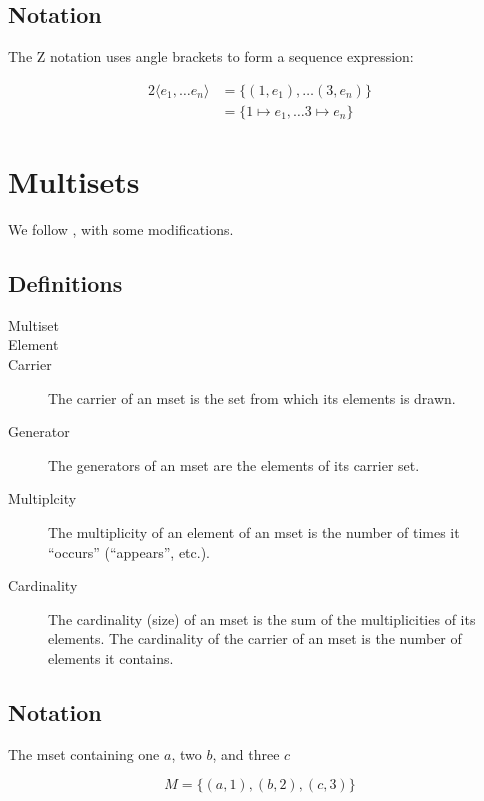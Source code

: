 \documentclass[reqno,12pt]{tufte-book}
\numberwithin{equation}{subsection}
\begin{document}
\subsection{Notation}

The Z notation uses angle brackets to form a sequence expression:

\begin{alignat}{2}
  \langle e_1,\ldots e_n\rangle &= \{(1,e_1),\ldots (3,e_n)\} \\
  &= \{1\mapsto e_1,\ldots 3\mapsto e_n\}
\end{alignat}

\section{Multisets}

We follow \citet{singh_overview_2007}, with some modifications.

\subsection{Definitions}

\begin{description}
\item [Multiset]
\item [Element]
\item [Carrier]  The carrier of an mset is the set from which its elements is drawn.
\item [Generator]  The generators of an mset are the elements of its carrier set.
\item [Multiplcity]  The multiplicity of an element of an mset is the number of times it ``occurs'' (``appears'', etc.).
\item [Cardinality] The cardinality (size) of an mset is the sum of
  the multiplicities of its elements.  The cardinality of the carrier of an mset is the number of elements it contains.
\end{description}

\subsection{Notation}

The mset containing one $a$, two $b$, and three $c$

\begin{equation}
  M = \{(a,1), (b,2), (c, 3)\}
\end{equation}
\end{document}

